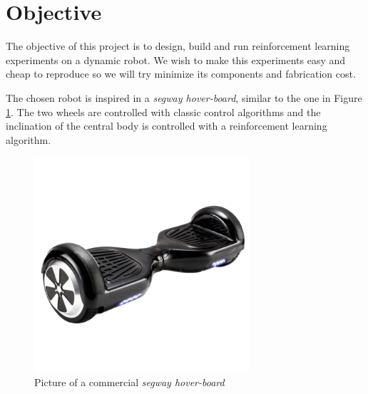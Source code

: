 \section{Objective}
The objective of this project is to design, build and run reinforcement learning experiments on a dynamic robot. We wish to make this experiments easy and cheap to reproduce so we will try minimize its components and fabrication cost. 

The chosen robot is inspired in a \textit{segway hover-board}, similar to the one in Figure \ref{fig:Picture of a commercial segway hover-board}. The two wheels are controlled with classic control algorithms and the inclination of the central body is controlled with a reinforcement learning algorithm.

\begin{figure}
	\centering
	\includegraphics[width=8cm]{img/segway_hoverboard_picture.png}
	\caption{Picture of a commercial \textit{segway hover-board} }
	\label{fig:Picture of a commercial segway hover-board}
\end{figure}